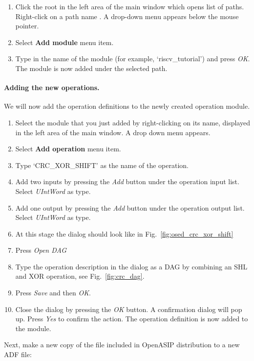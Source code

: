 \documentclass[a4paper,twoside]{tceusermanual}
\begin{document}
\begin{enumerate}
\item%
  Click the root in the left area of the main window which opens list
  of paths. Right-click on a path name
  . A drop-down menu appears
  below the mouse pointer.
\item%
  Select \textbf{Add module} menu item. 
\item%
  Type in the name of the module (for example, `riscv\_tutorial') and
  press \emph{OK}. The module is now added under the selected path.
\end{enumerate} 

\paragraph{Adding the new operations.} We will now add the operation
definitions to the newly created operation module.

\begin{enumerate}
\item%
  Select the module that you just added by right-clicking on its name,
  displayed in the left area of the main window. A drop down menu appears.
\item%
  Select \textbf{Add operation} menu item.
\item%
  Type `CRC\_XOR\_SHIFT' as the name of the operation.
\item%
  Add two inputs by pressing the \emph{Add} button under the operation input
  list. Select \textit{UIntWord} as type.
\item%
  Add one output by pressing the \emph{Add} button under the operation output
  list. Select \textit{UIntWord} as type.
\item%
  At this stage the dialog should look like in Fig.~\ref{fig:osed_crc_xor_shift}
\item%
  Press \emph{Open DAG}
\item%
  Type the operation description in the dialog as a DAG by combining an SHL
  and XOR operation, see Fig.~\ref{fig:crc_dag}.
\item%
  Press \emph{Save} and then \emph{OK}.
\item%
  Close the dialog by pressing the \emph{OK} button. A confirmation dialog
  will pop up. Press \emph{Yes} to confirm the action.
  The operation definition is now added to the module.
\end{enumerate}


Next, make a new copy of the  file included in OpenASIP distribution to a new ADF
file:
\end{document}
